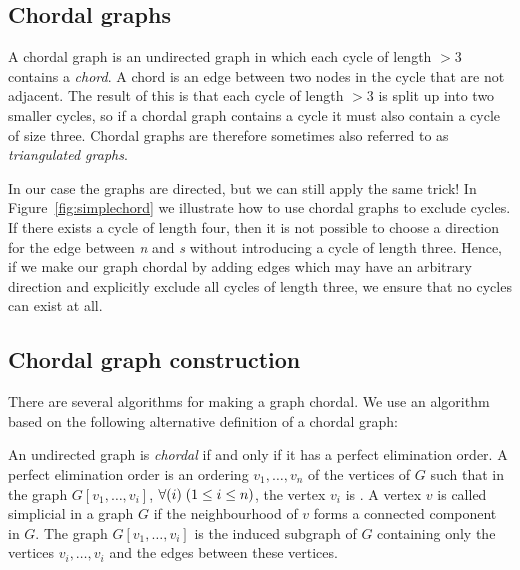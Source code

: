 \documentclass{llncs}
\newcommand{\figref}[1]{Figure~\ref{#1}}
\begin{document}
\subsection{Chordal graphs}
A chordal graph is an undirected graph in which each cycle of length $> 3$ contains a \emph{chord}. A chord is an edge between two nodes in the cycle that are not adjacent. The result of this is that each cycle of length $> 3$ is split up into two smaller cycles, so if a chordal graph contains a cycle it must also contain a cycle of size three. Chordal graphs are therefore sometimes also referred to as \emph{triangulated graphs}.


In our case the graphs are directed, but we can still apply the same trick! In \figref{fig:simplechord} we illustrate how to use chordal graphs to exclude cycles. If there exists a cycle of length four, then it is not possible to choose a direction for the edge between \emph{n} and \emph{s} without introducing a cycle of length three. Hence, if we make our graph chordal by adding edges which may have an arbitrary direction and explicitly exclude all cycles of length three, we ensure that no cycles can exist at all.

\subsection{Chordal graph construction} \label{sect:chordalconstruct}
There are several algorithms for making a graph chordal. We use an algorithm based on the following alternative definition of a chordal graph:

\begin{definition}
An undirected graph is \emph{chordal} if and only if it has a 
perfect elimination order. A perfect elimination order is an
ordering $v_1,\ldots,v_n$ of the vertices of $G$ such that in the graph
$G[v_1,\ldots,v_i]$, $\forall(i)\;(1 \leq i \leq n)$, the vertex $v_i$ is 
. A vertex $v$ is called simplicial in a graph $G$ if
the neighbourhood of $v$ forms a connected component in $G$.
The graph $G[v_1,\ldots,v_i]$ is the induced subgraph of $G$ containing
only the vertices $v_i,\ldots,v_i$ and the edges between these vertices.
\end{definition}
\end{document}
